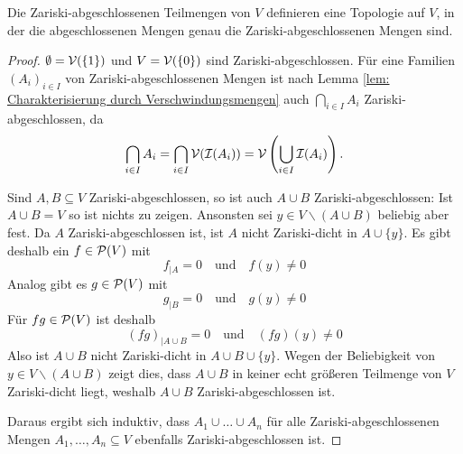 \documentclass[a4paper,10pt]{article}
\begin{document}
\begin{lem}
 Die Zariski-abgeschlossenen Teilmengen von $V$ definieren eine Topologie auf $V$, in der die abgeschlossenen Mengen genau die Zariski-abgeschlossenen Mengen sind.
\end{lem}
\begin{proof}
 $\emptyset = \mathcal{V}(\{1\})$ und $V = \mathcal{V}(\{0\})$ sind Zariski-abgeschlossen. Für eine Familien $(A_i)_{i \in I}$ von Zariski-abgeschlossenen Mengen ist nach Lemma \ref{lem: Charakterisierung durch Verschwindungsmengen} auch $\bigcap_{i \in I} A_i$ Zariski-ab\-ge\-schlos\-sen, da
 \begin{align*}
  \bigcap_{i \in I} A_i
  = \bigcap_{i \in I} \mathcal{V}(\mathcal{I}(A_i))
  = \mathcal{V}\left( \bigcup_{i \in I} \mathcal{I}(A_i) \right).
 \end{align*}
 
 Sind $A, B \subseteq V$ Zariski-abgeschlossen, so ist auch $A \cup B$ Zariski-ab\-ge\-schlos\-sen: Ist $A \cup B = V$ so ist nichts zu zeigen. Ansonsten sei $y \in V \smallsetminus (A \cup B)$ beliebig aber fest. Da $A$ Zariski-abgeschlossen ist, ist $A$ nicht Zariski-dicht in $A \cup \{y\}$. Es gibt deshalb ein $f \in \mathcal{P}(V)$ mit
\[
 f_{|A} = 0 \quad \text{und} \quad f(y) \neq 0
\]
Analog gibt es $g \in \mathcal{P}(V)$ mit
\[
 g_{|B} = 0 \quad \text{und} \quad g(y) \neq 0
\]
Für $fg \in \mathcal{P}(V)$ ist deshalb
\[
 (fg)_{|A \cup B} = 0 \quad \text{und} \quad (fg)(y) \neq 0
\]
Also ist $A \cup B$ nicht Zariski-dicht in $A \cup B \cup \{y\}$. Wegen der Beliebigkeit von \mbox{$y \in V \smallsetminus (A \cup B)$} zeigt dies, dass $A \cup B$ in keiner echt größeren Teilmenge von $V$ Zariski-dicht liegt, weshalb $A \cup B$ Zariski-abgeschlossen ist.

Daraus ergibt sich induktiv, dass $A_1 \cup \ldots \cup A_n$ für alle Zariski-abgeschlossenen Mengen $A_1, \ldots, A_n \subseteq V$ ebenfalls Zariski-abgeschlossen ist.
\end{proof}
\end{document}
